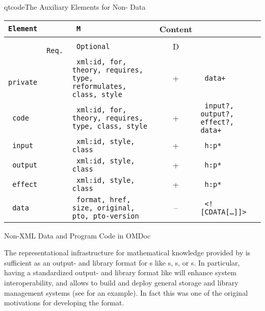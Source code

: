 \begin{module}[id=ext]
\begin{omgroup}[id=ext,short=Auxiliary Elements]
\begin{presonly}
\begin{myfig}{qtcode}{The \omdoc Auxiliary Elements for Non-{\xml} Data}
\begin{scriptsize}
\begin{tabular}{|>{\tt}l|>{\tt}l|>{\tt}p{}|c|>{\tt}p{}|}\hline
{\rm Element}& \multicolumn{2}{l|}{Attributes\hspace*{2.25cm}} & M & Content  \\\hline
             & {\rm Req.} & {\rm Optional}                     & D & \\\hline\hline
 private     &            & xml:id, for, theory, 
                               requires, type, reformulates, class, style
                                               & +  &  data+ \\\hline
 code        &            & xml:id, for, theory, 
                              requires, type, class, style
                              & +  & input?, output?, effect?, data+ \\\hline
 input       &            & xml:id, style, class   & + & h:p*\\\hline
 output      &            & xml:id, style, class   & + & h:p*\\\hline
 effect      &            & xml:id, style, class   & + & h:p*\\\hline
 data        &            & format, href, size, original, pto, pto-version 
                                               & -- & <![CDATA[\ldots]]> \\\hline
\end{tabular}
\end{scriptsize}
\end{myfig}
\end{presonly}

\begin{omgroup}[id=private]{Non-XML Data and Program Code in OMDoc}

The representational infrastructure for mathematical knowledge provided by \omdoc is
sufficient as an output- and library format for
{s} like {s},
{s}, or {s}. In particular,
having a standardized output- and library format like \omdoc will enhance system
interoperability, and allows to build and deploy general storage and library management
systems (see {} for an \omdoc example). In fact this was one of the
original motivations for developing the format.
  

\end{omgroup}
\end{omgroup}
\end{module}
